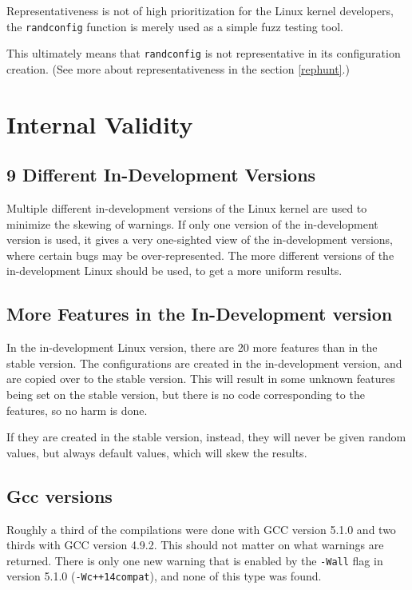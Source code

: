 \documentclass[a4paper,11pt]{report}
\begin{document}
Representativeness is not of high prioritization for the Linux kernel 
developers, the \texttt{randconfig} function is merely used as a simple fuzz 
testing tool.

This ultimately means that \texttt{randconfig} is not representative in its 
configuration creation. (See more about representativeness in the section 
\ref{rephunt}.)
\\



            \section{Internal Validity}
            \label{sec:intval}


            \subsection{9 Different In-Development Versions}
Multiple different in-development versions of the Linux kernel are used to 
minimize the skewing of warnings. If only one version of the in-development 
version is used, it gives a very one-sighted view of the in-development 
versions, where certain bugs may be over-represented. The more different 
versions of the in-development Linux should be used, to get a more uniform 
results.


            \subsection{More Features in the In-Development version}
In the in-development Linux version, there are 20 more features than in the 
stable version. The configurations are created in the in-development version, 
and are copied over to the stable version. This will result in some unknown 
features being set on the stable version, but there is no code corresponding to 
the features, so no harm is done.

If they are created in the stable version, instead, they will never be given 
random values, but always default values, which will skew the results.
\\


            \subsection{Gcc versions}
Roughly a third of the compilations were done with GCC version 5.1.0 and two 
thirds with GCC version 4.9.2. This should not matter on what warnings are 
returned. There is only one new warning that is enabled by the \texttt{-Wall} 
flag in version 5.1.0 (\texttt{-Wc++14compat}), and none of this type was found.
\\
\end{document}
